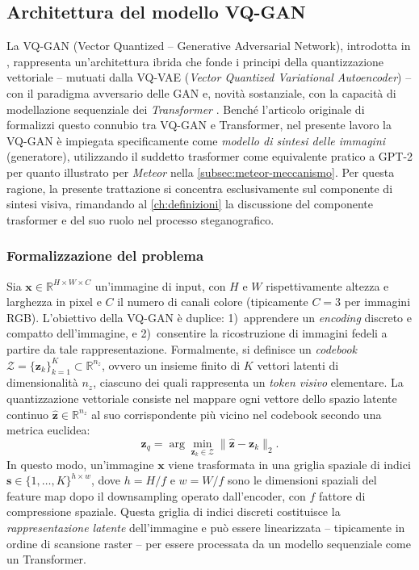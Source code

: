 \subsection{Architettura del modello VQ-GAN}
\label{subsec:vqgan-architettura}

La VQ-GAN (Vector Quantized -- Generative Adversarial Network), introdotta in \cite{esser-2020}, rappresenta un'architettura ibrida che fonde i principi della quantizzazione vettoriale -- mutuati dalla VQ-VAE (\emph{Vector Quantized Variational Autoencoder}) \cite{van-den-oord-2017} -- con il paradigma avversario delle GAN \cite{goodfellow-2014} e, novità sostanziale, con la capacità di modellazione sequenziale dei \emph{Transformer} \cite{vaswani-2017}. Benché l'articolo originale di \textcite{esser-2020} formalizzi questo connubio tra VQ-GAN e Transformer, nel presente lavoro la VQ-GAN è impiegata specificamente come \emph{modello di sintesi delle immagini} (generatore), utilizzando il suddetto trasformer come equivalente pratico a GPT-2 per quanto illustrato per \emph{Meteor} nella \autoref{subsec:meteor-meccanismo}. Per questa ragione, la presente trattazione si concentra esclusivamente sul componente di sintesi visiva, rimandando al \autoref{ch:definizioni} la discussione del componente trasformer e del suo ruolo nel processo steganografico.

\subsubsection{Formalizzazione del problema}
Sia $\mathbf{x} \in \mathbb{R}^{H \times W \times C}$ un'immagine di input, con $H$ e $W$ rispettivamente altezza e larghezza in pixel e $C$ il numero di canali colore (tipicamente $C = 3$ per immagini RGB). L'obiettivo della VQ-GAN è duplice: 1)~apprendere un \emph{encoding} discreto e compatto dell'immagine, e 2)~consentire la ricostruzione di immagini fedeli a partire da tale rappresentazione. Formalmente, si definisce un \emph{codebook} $\mathcal{Z} = \{\mathbf{z}_k\}_{k=1}^{K} \subset \mathbb{R}^{n_z}$, ovvero un insieme finito di $K$ vettori latenti di dimensionalità $n_z$, ciascuno dei quali rappresenta un \emph{token visivo} elementare. La quantizzazione vettoriale consiste nel mappare ogni vettore dello spazio latente continuo $\hat{\mathbf{z}} \in \mathbb{R}^{n_z}$ al suo corrispondente più vicino nel codebook secondo una metrica euclidea:
\begin{equation}
	\mathbf{z}_q = \arg\min_{\mathbf{z}_k \in \mathcal{Z}} \|\hat{\mathbf{z}} - \mathbf{z}_k\|_2.
\end{equation}
In questo modo, un'immagine $\mathbf{x}$ viene trasformata in una griglia spaziale di indici $\mathbf{s} \in \{1, \dots, K\}^{h \times w}$, dove $h = H / f$ e $w = W / f$ sono le dimensioni spaziali del feature map dopo il downsampling operato dall'encoder, con $f$ fattore di compressione spaziale. Questa griglia di indici discreti costituisce la \emph{rappresentazione latente} dell'immagine e può essere linearizzata -- tipicamente in ordine di scansione raster -- per essere processata da un modello sequenziale come un Transformer.

